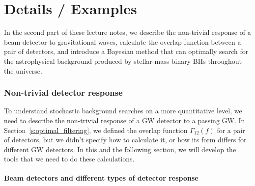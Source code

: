 \part{Details / Examples}
\label{p:details}

In the second part of these lecture notes, 
we describe the non-trivial response of a beam
detector to gravitational waves, calculate the overlap function
between a pair of detectors, and introduce a Bayesian method that
can optimally search for the astrophysical background 
produced by stellar-mass binary BHs throughout the universe.

\section{Non-trivial detector response}
\label{s:nontrivial_response}

To understand stochastic background searches on a 
more quantitative level, we need to describe the 
non-trivial response of a GW detector to a passing GW.
In Section~\ref{s:optimal_filtering}, we defined the 
overlap function $\Gamma_{12}(f)$
for a pair of detectors, but we didn't specify how 
to calculate it, or how its form differs for different
GW detectors.
In this and the following section, we will develop
the tools that we need to do these calculations.

\subsection{Beam detectors and different types of 
detector response}

